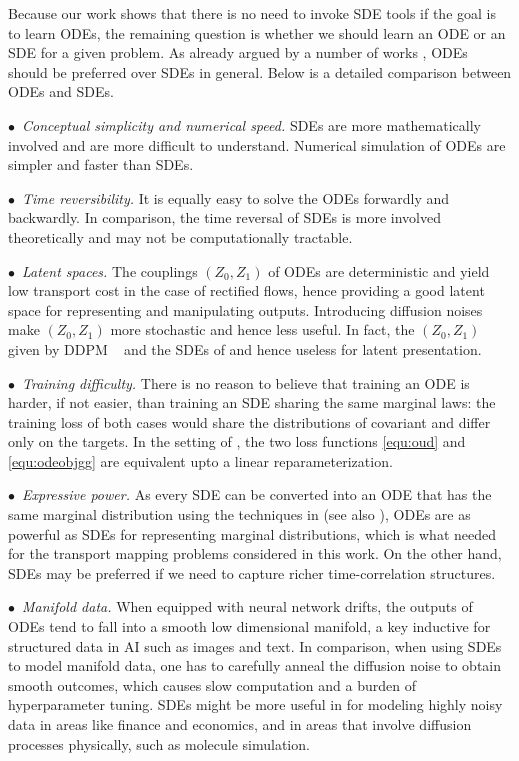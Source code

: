Because our work shows that there is no need to invoke SDE tools if the goal is to learn ODEs,
the remaining question is 
whether we should learn an ODE or an SDE 
for a given problem. 
As already argued by a number of works 
\citep{song2020score,song2020denoising, elucidating},  
ODEs should be preferred over SDEs in general. 
Below is a detailed comparison between ODEs and SDEs. 


 $\bullet$~\emph{Conceptual simplicity and numerical speed.} %
 SDEs are more mathematically involved and  are more difficult to understand.  Numerical simulation of ODEs are simpler and faster than SDEs. 


$\bullet$~\emph{Time reversibility.} 
It is equally easy to 
solve the ODEs 
forwardly and backwardly.  
In comparison, the time reversal of 
SDEs  \citep[e.g.,][]{anderson1982reverse, haussmann1986time, follmer1985entropy} 
is more involved theoretically and may not be computationally tractable. %


 $\bullet$~\emph{Latent spaces.} 
 The couplings $(Z_0,Z_1)$ 
 of ODEs are deterministic and yield low transport cost in the case of rectified flows, 
 hence providing  a good latent space for representing and manipulating outputs. 
 Introducing diffusion noises 
 make $(Z_0,Z_1)$ more stochastic and hence less useful. In fact, the $(Z_0,Z_1)$ given by DDPM ~\cite{ho2020denoising} and the SDEs of \cite{song2020score} and hence useless for latent presentation. 

 
 $\bullet$~\emph{Training difficulty.}  
 There is no reason to believe 
that training an ODE is harder, if not easier, 
than training an SDE sharing the same marginal laws: the training loss of both cases would  share the distributions of covariant and differ only on the targets. In the setting of \citep{song2020score}, the two loss functions \eqref{equ:oud} and \eqref{equ:odeobjgg} are equivalent upto a linear reparameterization.


$\bullet$~\emph{Expressive power.}   
As every SDE can be converted into an ODE that has the same marginal distribution using the techniques in \cite{song2020denoising, song2020score} (see also \cite{villani2009optimal}), ODEs are as powerful as SDEs for representing marginal distributions,
which is what needed for the transport mapping problems considered in this work. 
On the other hand, SDEs may be preferred if we need to capture richer time-correlation structures. 

 $\bullet$~\emph{Manifold data.}
 When equipped with neural network drifts, 
 the outputs of ODEs tend to fall into a smooth low dimensional manifold,  a key inductive for 
  structured data in AI such as images and text. %
 In comparison, 
 when using SDEs to model manifold data,
 one has to carefully anneal the diffusion noise 
 to obtain smooth outcomes, which  causes slow computation and a burden of hyperparameter tuning. 
 SDEs might be more useful in 
 for modeling highly noisy data in areas like finance and economics, and in 
areas  that involve diffusion processes physically, such as molecule simulation. 

